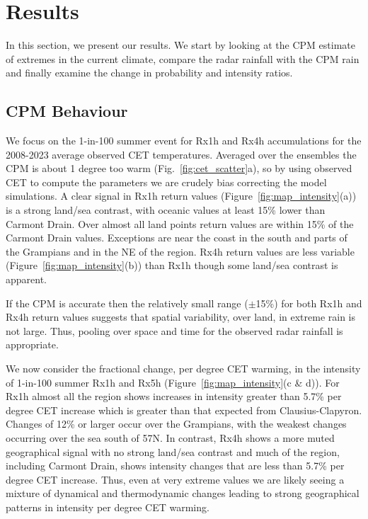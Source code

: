 \documentclass[11pt,a4paper]{article}
\begin{document}
\section{Results}

In this section, we present our results. We start by looking at the CPM estimate of extremes in the current climate, compare the radar rainfall with the CPM rain and finally examine the change in probability and intensity ratios. 
\subsection{CPM Behaviour}
We focus on the 1-in-100 summer event for Rx1h and Rx4h accumulations for the  2008-2023 average observed CET temperatures. Averaged over the  ensembles the CPM is about 1 degree too warm (Fig.~\ref{fig:cet_scatter}a), so by using observed CET to compute the parameters we are crudely bias correcting the model simulations. A clear signal in Rx1h return values (Figure~\ref{fig:map_intensity}(a)) is a strong land/sea contrast, with oceanic values at least 15\% lower than Carmont Drain.  Over almost all  land points return values are within 15\% of the Carmont Drain values. Exceptions are near the coast in the south and parts of the Grampians  and in the NE of the region. Rx4h  return values are less variable (Figure~\ref{fig:map_intensity}(b)) than Rx1h though some land/sea contrast is apparent.  

If the CPM is accurate then the relatively small range ($\pm$15\%) for both Rx1h and Rx4h  return values suggests that spatial variability, over land,  in extreme rain is not large.  Thus, pooling over space and time for the observed radar rainfall is appropriate. 


We now consider the fractional change, per degree CET warming,  in the intensity of 1-in-100 summer Rx1h and Rx5h (Figure~\ref{fig:map_intensity}(c \& d)). For Rx1h almost all the region shows increases in intensity greater than 5.7\% per degree CET increase which is greater than that expected from Clausius-Clapyron. Changes of 12\% or larger occur over the Grampians, with the weakest changes occurring over the sea south of 57N. In contrast, Rx4h shows a  more muted geographical signal with no strong land/sea contrast and much of the region, including Carmont Drain, shows intensity changes that are less than  5.7\% per degree CET increase.  Thus, even at very extreme values we are likely seeing a mixture of dynamical and thermodynamic  changes leading to  strong geographical patterns in  intensity per degree CET warming.
\end{document}
